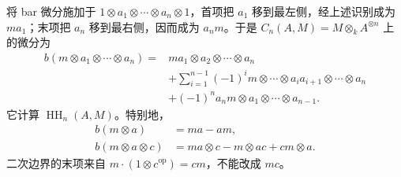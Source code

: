 \ProseParagraphBreak
将 bar 微分施加于 \(1\otimes a_1\otimes\cdots\otimes a_n\otimes1\)，首项把 \(a_1\) 移到最左侧，经上述识别成为 \(ma_1\)；末项把 \(a_n\) 移到最右侧，因而成为 \(a_nm\)。于是 \(C_n(A,M)=M\otimes_k A^{\otimes n}\) 上的微分为
\begin{equation}\label{b4:eq:hochschild-boundary}
	\begin{aligned}
		b(m\otimes a_1\otimes\cdots\otimes a_n) ={}&ma_1\otimes a_2\otimes\cdots\otimes a_n\\
		&+\sum_{i=1}^{n-1}(-1)^i m\otimes\cdots\otimes a_i a_{i+1}\otimes\cdots\otimes a_n\\
		&+(-1)^n a_n m\otimes a_1\otimes\cdots\otimes a_{n-1}.
	\end{aligned}
\end{equation}
它计算 \(\operatorname{HH}_n(A,M)\)。特别地，
\[
	\begin{aligned}
		b(m\otimes a)&=ma-am,\\
		b(m\otimes a\otimes c)&=ma\otimes c-m\otimes ac+cm\otimes a.
	\end{aligned}
\]
二次边界的末项来自 \(m\cdot(1\otimes c^{\mathrm{op}})=cm\)，不能改成 \(mc\)。

